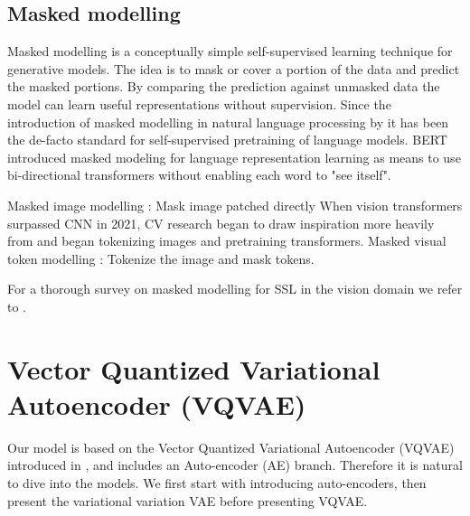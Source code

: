 \documentclass[../../thesis.tex]{subfiles}
\begin{document}

\subsection{Masked modelling}
Masked modelling is a conceptually simple self-supervised learning technique for generative models. The idea is to mask or cover a portion of the data and predict the masked portions. By comparing the prediction against unmasked data the model can learn useful representations without supervision. Since the introduction of masked modelling in natural language processing by \cite{devlin2019bert} it has been the de-facto standard for self-supervised pretraining of language models. BERT introduced masked modeling for language representation learning as means to use bi-directional transformers without enabling each word to "see itself". \newline
{}


Masked image modelling \cite{he2021masked}: Mask image patched directly \newline
When vision transformers \cite{dosovitskiy2021image} surpassed CNN in 2021\cite{he2015deep}, CV research began to draw inspiration more heavily from \cite{devlin2019bert} and began tokenizing images and pretraining transformers.\newline
Masked visual token modelling \cite{chang2022maskgit}: Tokenize the image and mask tokens. \newline




For a thorough survey on masked modelling for SSL in the vision domain we refer to \cite{li2024masked}. 





\section{Vector Quantized Variational Autoencoder (VQVAE)}
Our model is based on the Vector Quantized Variational Autoencoder (VQVAE) introduced in \cite{VQVAE}, and includes an Auto-encoder (AE) branch. Therefore it is natural to dive into the models. We first start with introducing auto-encoders, then present the variational variation VAE before presenting VQVAE. 
\end{document}
